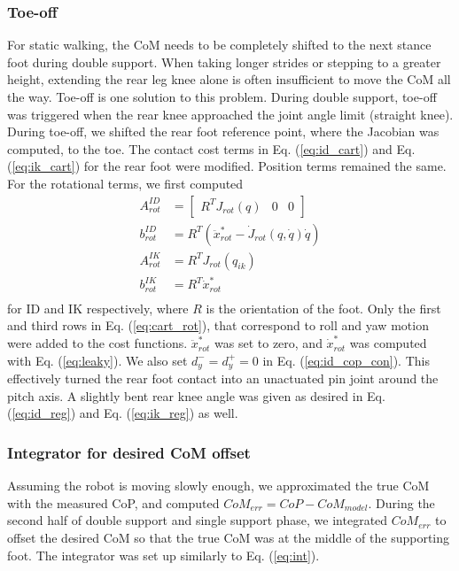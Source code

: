 \documentclass{ws-ijhr}
\newcommand{\eref}[1] {Eq. (\ref{#1})}
\begin{document}
\subsubsection{Toe-off}
For static walking, the CoM needs to be completely shifted to the next stance foot 
during double support. 
When taking longer strides or stepping to a greater height, extending the 
rear leg knee alone is often insufficient to move the CoM all the way. 
Toe-off is one solution to this problem. 
During double support, toe-off was triggered when the rear knee approached the 
joint angle limit (straight knee). 
During toe-off, we shifted the rear foot reference point, where the Jacobian was 
computed, to the toe. 
The contact cost terms in \eref{eq:id_cart} and \eref{eq:ik_cart} for the rear 
foot were modified. 
Position terms remained the same. 
For the rotational terms, we first computed
\begin{equation}
  \begin{split}
    A^{ID}_{rot} &= \begin{bmatrix} R^T J_{rot}(q) & 0 & 0 \end{bmatrix} \\
		b^{ID}_{rot} &= R^T (\ddot{x}^*_{rot} - \dot{J}_{rot}(q,\dot{q}) \dot{q}) \\
    A^{IK}_{rot} &= R^T J_{rot}(q_{ik}) \\
    b^{IK}_{rot} &= R^T \dot{x}^*_{rot} \\
  \end{split}
	\label{eq:cart_rot}
\end{equation}   
for ID and IK respectively, where $R$ is the orientation of the foot. 
Only the first and third rows in \eref{eq:cart_rot}, that correspond to 
roll and yaw motion were added to the cost functions.
$\ddot{x}^*_{rot}$ was set to zero, and $\dot{x}^*_{rot}$ was computed with \eref{eq:leaky}.
We also set $d^-_y = d^+_y = 0$ in \eref{eq:id_cop_con}. 
This effectively turned the rear foot contact into an unactuated pin joint 
around the pitch axis. 
A slightly bent rear knee angle was given as desired in \eref{eq:id_reg} and 
\eref{eq:ik_reg} as well.

\subsubsection{Integrator for desired CoM offset}
\label{sec:com_int}
Assuming the robot is moving slowly enough, we approximated the true CoM 
with the measured CoP, and computed $CoM_{err} = CoP - CoM_{model}$.
During the second half of double support and single support phase, 
we integrated $CoM_{err}$ to offset the desired CoM so that the true CoM was at 
the middle of the supporting foot. 
The integrator was set up similarly to \eref{eq:int}. 
\end{document}

